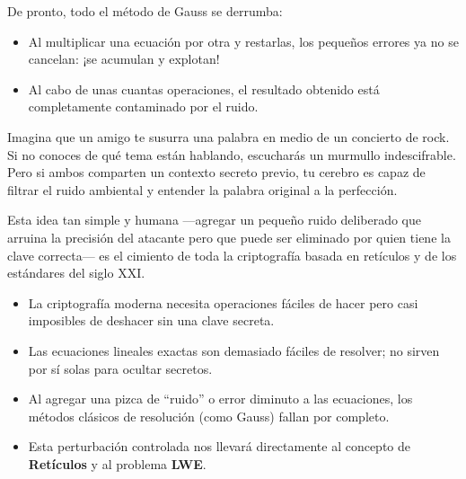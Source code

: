 De pronto, todo el método de Gauss se derrumba:
\begin{itemize}
  \item Al multiplicar una ecuación por otra y restarlas, los pequeños errores ya no se cancelan: ¡se acumulan y explotan!
  \item Al cabo de unas cuantas operaciones, el resultado obtenido está completamente contaminado por el ruido.
\end{itemize}

\begin{metafora}
Imagina que un amigo te susurra una palabra en medio de un concierto de rock. Si no conoces de qué tema están hablando, escucharás un murmullo indescifrable. Pero si ambos comparten un contexto secreto previo, tu cerebro es capaz de filtrar el ruido ambiental y entender la palabra original a la perfección.
\end{metafora}

Esta idea tan simple y humana ---agregar un pequeño ruido deliberado que arruina la precisión del atacante pero que puede ser eliminado por quien tiene la clave correcta--- es el cimiento de toda la criptografía basada en retículos y de los estándares del siglo XXI.

\begin{resumencapitulo}
\begin{itemize}
  \item La criptografía moderna necesita operaciones fáciles de hacer pero casi imposibles de deshacer sin una clave secreta.
  \item Las ecuaciones lineales exactas son demasiado fáciles de resolver; no sirven por sí solas para ocultar secretos.
  \item Al agregar una pizca de ``ruido'' o error diminuto a las ecuaciones, los métodos clásicos de resolución (como Gauss) fallan por completo.
  \item Esta perturbación controlada nos llevará directamente al concepto de \textbf{Retículos} y al problema \textbf{LWE}.
\end{itemize}
\end{resumencapitulo}
